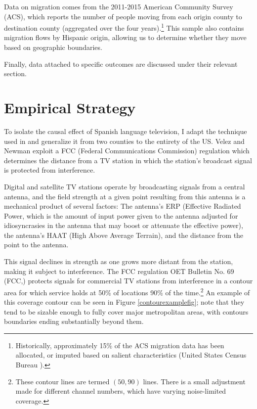 \documentclass[11pt]{article}
\begin{document}
Data on migration comes from the 2011-2015 American Community Survey (ACS), which reports the number of people moving from each origin county to destination county (aggregated over the four years).\footnote{ Historically, approximately 15\% of the ACS migration data has been allocated, or imputed based on salient characteristics (United States Census Bureau \cite{noauthor_american_2020}). } This sample also contains migration flows by Hispanic origin, allowing us to determine whether they move based on geographic boundaries.

Finally, data attached to specific outcomes are discussed under their relevant section.


\section{Empirical Strategy}\label{s:rd}

To isolate the causal effect of Spanish language television, I adapt the technique used in \cite{velez_tuning_2019}  and generalize it from two counties to the entirety of the US. Velez and Newman exploit a FCC (Federal Communications Commission) regulation which determines the distance from a TV station in which the station's broadcast signal is protected from interference.

Digital and satellite TV stations operate by broadcasting signals from a central antenna, and the field strength at a given point resulting from this antenna is a mechanical product of several factors: The antenna's ERP (Effective Radiated Power, which is the amount of input power given to the antenna adjusted for idiosyncrasies in the antenna that may boost or attenuate the effective power), the antenna's HAAT (High Above Average Terrain), and the distance from the point to the antenna.


This signal declines in strength as one grows more distant from the station, making it subject to interference. The FCC regulation OET Bulletin No. 69 (FCC,\cite{noauthor_oet_2004}) protects signals for commercial TV stations from interference in a contour area for which service holds at 50\% of locations 90\% of the time.\footnote{ These contour lines are termed $(50,90)$ lines. There is a small adjustment made for different channel numbers, which have varying noise-limited coverage. } An example of this coverage contour can be seen in Figure \ref{contourexamplefig}; note that they tend to be sizable enough to fully cover major metropolitan areas, with contours boundaries ending substantially beyond them.
\end{document}
